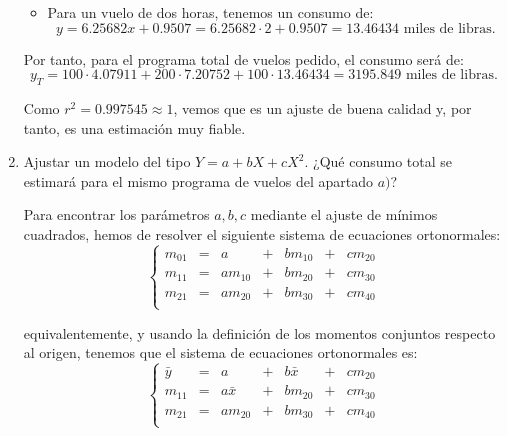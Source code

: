 \begin{ejercicio}
\begin{enumerate}
\begin{itemize}
            \item Para un vuelo de dos horas, tenemos un consumo de:
            \begin{equation*}
                y = 6.25682x +0.9507 = 6.25682\cdot 2 +0.9507 = 13.46434 \text{ miles de libras.}
            \end{equation*}
        \end{itemize}
        Por tanto, para el programa total de vuelos pedido, el consumo será de:
        \begin{equation*}
            y_T = 100\cdot 4.07911 + 200\cdot 7.20752 + 100\cdot 13.46434 = 3195.849\text{ miles de libras.}
        \end{equation*}

        Como $r^2=0.997545\approx 1$, vemos que es un ajuste de buena calidad y, por tanto, es una estimación muy fiable.

        \item Ajustar un modelo del tipo $Y = a + bX + cX^2.$ ¿Qué consumo total se estimará para el mismo programa de vuelos del apartado $a)$?
        
        Para encontrar los parámetros $a,b,c$ mediante el ajuste de mínimos cuadrados, hemos de resolver el siguiente sistema de ecuaciones ortonormales:
        \begin{equation*}
            \left\{ \begin{array}{rcrcrcr}
                m_{01} &=& a &+&bm_{10} &+& cm_{20}  \\
                m_{11} &=& am_{10} &+& bm_{20} &+&cm_{30}  \\
                m_{21} &=& am_{20} &+& bm_{30} &+&cm_{40}  \\
            \end{array}\right.
        \end{equation*}

        equivalentemente, y usando la definición de los momentos conjuntos respecto al origen, tenemos que el sistema de ecuaciones ortonormales es:
        \begin{equation*}
            \left\{ \begin{array}{rcrcrcr}
                \bar{y} &=& a &+&b\bar{x} &+& cm_{20}  \\
                m_{11} &=& a\bar{x} &+& bm_{20} &+&cm_{30}  \\
                m_{21} &=& am_{20} &+& bm_{30} &+&cm_{40}  \\
            \end{array}\right.
        \end{equation*}


\end{enumerate}
\end{ejercicio}
